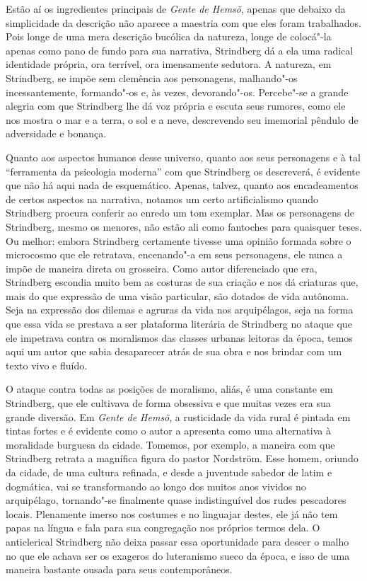 Estão aí os ingredientes principais de \textit{Gente de Hemsö},
apenas que debaixo da simplicidade da descrição não aparece a
maestria com que eles foram trabalhados. Pois longe de uma mera
descrição bucólica da natureza, longe de colocá"-la apenas como pano de
fundo para sua narrativa, Strindberg dá a ela uma radical identidade
própria, ora terrível, ora imensamente sedutora. A natureza, em
Strindberg, se impõe sem clemência aos personagens, malhando"-os
incessantemente, formando"-os e, às vezes, devorando"-os. Percebe"-se a
grande alegria com que Strindberg lhe dá voz própria e escuta seus
rumores, como ele nos mostra o mar e a terra, o sol e a neve, descrevendo
seu imemorial pêndulo de adversidade e bonança. 

Quanto aos aspectos humanos desse universo, quanto aos seus personagens
e à tal “ferramenta da psicologia moderna” com que Strindberg
os descreverá, é evidente que não há aqui nada de esquemático. Apenas,
talvez, quanto aos encadeamentos de certos aspectos na narrativa,
notamos um certo artificialismo quando Strindberg procura conferir ao enredo 
um tom exemplar. Mas os personagens de Strindberg, mesmo os
menores, não estão ali como fantoches para quaisquer teses. Ou melhor:
embora Strindberg certamente tivesse uma opinião formada sobre o
microcosmo que ele retratava, encenando"-a em seus personagens, ele
nunca a impõe de maneira direta ou grosseira. Como autor diferenciado
que era, Strindberg escondia muito bem as costuras de sua criação e nos
dá criaturas que, mais do que expressão de uma visão particular, são
dotados de vida autônoma. Seja na expressão dos dilemas e agruras da
vida nos arquipélagos, seja na forma que essa vida se prestava a ser
plataforma literária de Strindberg no ataque que ele impetrava contra
os moralismos das classes urbanas leitoras da época, temos aqui um
autor que sabia desaparecer atrás de sua obra e nos brindar com um
texto vivo e fluído. 

O ataque contra todas as posições de moralismo, aliás, é uma constante
em Strindberg, que ele cultivava de forma obsessiva e que
muitas vezes era sua grande diversão. Em \textit{Gente de Hemsö}, a
rusticidade da vida rural é pintada em tintas fortes e é evidente como
o autor a apresenta como uma alternativa à moralidade burguesa da
cidade. Tomemos, por exemplo, a maneira com que Strindberg retrata a
magnífica figura do pastor Nordström. Esse homem, oriundo da cidade, 
de uma cultura refinada, e desde a juventude sabedor de latim e
dogmática, vai se transformando ao longo dos muitos anos vividos
no arquipélago, tornando"-se finalmente quase indistinguível dos rudes
pescadores locais. Plenamente imerso nos costumes e no
linguajar destes, ele já não tem papas na língua e fala para sua
congregação nos próprios termos dela. O anticlerical Strindberg não deixa
passar essa oportunidade para descer o malho no que ele achava ser os
exageros do luteranismo sueco da época, e isso de uma maneira bastante
ousada para seus contemporâneos. 

